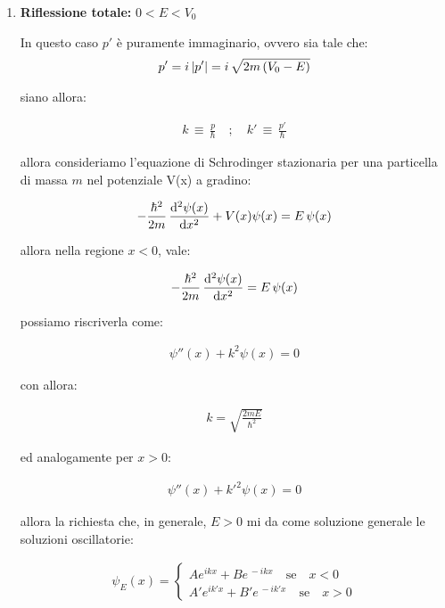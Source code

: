 \begin{enumerate}[label=\arabic*)]

	\item \textbf{Riflessione totale:} $0 < E < V_0$
	
		In questo caso $p'$ è puramente immaginario, ovvero sia tale che:
	\begin{align*}
		p' = i \, |p'| = i \, \sqrt{2m \, \qty(V_0 - E)}
	\end{align*}
	
		siano allora:
		
	\begin{align*}
		k \, \equiv \, \frac{p}{\hbar} \quad ; \quad k' \, \equiv \, \frac{p'}{\hbar}
	\end{align*}
	
	allora consideriamo l’equazione di Schrodinger stazionaria per una particella di massa $m$ nel potenziale V(x) a gradino:
		
\begin{align*}
	-\frac{\hbar^2}{2m} \, \dv[2]{\psi(x)}{x} + V(x) \psi(x) = E \, \psi(x)
\end{align*}

	allora nella regione $x < 0$, vale:
	
\begin{align*}
	-\frac{\hbar^2}{2m} \, \dv[2]{\psi(x)}{x} = E \, \psi(x)
\end{align*}

	possiamo riscriverla come:
	
\begin{align*}
	\psi''(x) + k^2 \psi(x) = 0
\end{align*}

	con allora:
	
\begin{align*}
	k = \sqrt{\frac{2mE}{\hbar^2}}
\end{align*}

	ed analogamente per $x > 0$:
	
\begin{align*}
	\psi''(x) + k'^2 \psi(x) = 0
\end{align*}

	allora la richiesta che, in generale, $E > 0$ mi da come soluzione generale le soluzioni oscillatorie:
		 
	\begin{align*}
		\psi_E(x) = \begin{cases}
			Ae^{ikx} + Be^{\, -ikx} \quad \text{se} \quad x < 0 \\
			A'e^{ik'x} + B'e^{\, -ik'x} \quad \text{se} \quad x > 0
		\end{cases}
	\end{align*}
	

\end{enumerate}
